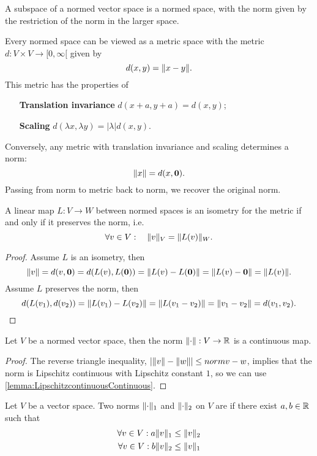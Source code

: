 \begin{lemma}
A subspace of a normed vector space is a normed space, with the norm given by the restriction of the norm in the larger space.
\end{lemma}

\begin{proposition}
Every normed space can be viewed as a metric space with the metric $d:V\times V \to [0,\infty[$ given by
\[ d(x,y) = \lVert x-y\rVert. \]
This metric has the properties of
\begin{itemize}[leftmargin=6cm]
\item[\textbf{Translation invariance}] $d(x+a, y+a) = d(x,y)$;
\item[\textbf{Scaling}] $d(\lambda x, \lambda y) = |\lambda|d(x,y)$.
\end{itemize}
Conversely, any metric with translation invariance and scaling determines a norm:
\[ \lVert x\rVert = d(x,\bm{\mathrm{0}}). \]
Passing from norm to metric back to norm, we recover the original norm.
\end{proposition}
\begin{lemma}
A linear map $L:V\to W$ between normed spaces is an isometry for the metric \textup{if and only if} it preserves the norm, i.e.
\[ \forall v\in V: \quad \lVert v\rVert_V = \lVert L(v)\rVert_W. \]
\end{lemma}
\begin{proof}
Assume $L$ is an isometry, then
\[ \lVert v\rVert = d(v,\bm{\mathrm{0}}) = d(L(v),L(\bm{\mathrm{0}})) = \lVert L(v) - L(\bm{\mathrm{0}})\rVert = \lVert L(v) - \bm{\mathrm{0}}\rVert = \lVert L(v)\rVert. \]
Assume $L$ preserves the norm, then
\[ d(L(v_1), d(v_2)) = \lVert L(v_1)-L(v_2)\rVert = \lVert L(v_1-v_2)\rVert = \lVert v_1-v_2\rVert = d(v_1,v_2). \]
\end{proof}

\begin{proposition}
Let $V$ be a normed vector space, then the norm $\lVert\cdot\rVert:V\to \mathbb{R}$ is a continuous map.
\end{proposition}
\begin{proof}
The reverse triangle inequality, $|\lVert v\rVert-\lVert w\rVert| \leq norm{v-w}$, implies that the norm is Lipschitz continuous with Lipschitz constant $1$, so we can use \ref{lemma:LipschitzcontinuousContinuous}.
\end{proof}

\begin{definition}
Let $V$ be a vector space. Two norms $\lVert\cdot\rVert_1$ and $\lVert\cdot\rVert_2$ on $V$ are  if there exist $a,b\in \mathbb{R}$ such that
\begin{align*}
\forall v\in V: a\lVert v\rVert_1&\leq \lVert v\rVert_2 \\
\forall v\in V: b\lVert v\rVert_2&\leq \lVert v\rVert_1
\end{align*}
\end{definition}

